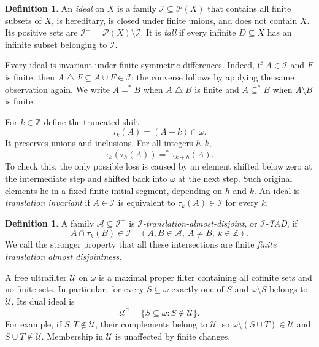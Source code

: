 \documentclass[11pt,a4paper]{article}
\theoremstyle{definition}
\newtheorem{definition}[theorem]{Definition}
\theoremstyle{remark}
\newcommand{\I}{\mathcal I}
\newcommand{\U}{\mathcal U}
\newcommand{\A}{\mathcal A}
\newcommand{\Pow}{\mathcal P}
\newcommand{\sh}[2]{\tau_{#1}(#2)}
\newcommand{\eqfin}{=^{*}}
\newcommand{\subfin}{\subseteq^{*}}
\begin{document}
\begin{definition}
An \emph{ideal} on $X$ is a family $\I\subseteq\Pow(X)$ that contains all
finite subsets of $X$, is hereditary, is closed under finite unions, and
does not contain $X$. Its positive sets are
$\I^+=\Pow(X)\setminus\I$. It is \emph{tall} if every infinite
$D\subseteq X$ has an infinite subset belonging to $\I$.
\end{definition}

Every ideal is invariant under finite symmetric differences. Indeed,
if $A\in\I$ and $F$ is finite, then $A\mathbin\triangle F\subseteq
A\cup F\in\I$; the converse follows by applying the same observation
again. We write $A\eqfin B$ when $A\mathbin\triangle B$ is finite and
$A\subfin B$ when $A\setminus B$ is finite.

For $k\in\mathbb Z$ define the truncated shift
\begin{equation}
\label{eq:shift}
                 \sh{k}{A}=(A+k)\cap\omega.
\end{equation}
It preserves unions and inclusions. For all integers $h,k$,
\begin{equation}
\label{eq:composition}
           \sh{k}{\sh{h}{A}}\eqfin\sh{k+h}{A}.
\end{equation}
To check this, the only possible loss is caused by an element shifted
below zero at the intermediate step and shifted back into $\omega$ at
the next step. Such original elements lie in a fixed finite initial
segment, depending on $h$ and $k$. An ideal is \emph{translation
invariant} if $A\in\I$ is equivalent to $\sh{k}{A}\in\I$ for every $k$.

\begin{definition}
A family $\A\subseteq\I^+$ is \emph{$\I$-translation-almost-disjoint},
or \emph{$\I$-TAD}, if
\[
             A\cap\sh{k}{B}\in\I
     \quad(A,B\in\A,\ A\ne B,\ k\in\mathbb Z).
\]
We call the stronger property that all these intersections are finite
\emph{finite translation almost disjointness}.
\end{definition}

A free ultrafilter $\U$ on $\omega$ is a maximal proper filter containing
all cofinite sets and no finite sets. In particular, for every
$S\subseteq\omega$ exactly one of $S$ and $\omega\setminus S$ belongs to
$\U$. Its dual ideal is
\[
           \U^{\mathrm d}=\{S\subseteq\omega:S\notin\U\}.
\]
For example, if $S,T\notin\U$, their complements belong to $\U$, so
$\omega\setminus(S\cup T)\in\U$ and $S\cup T\notin\U$.
Membership in $\U$ is unaffected by finite changes.
\end{document}
